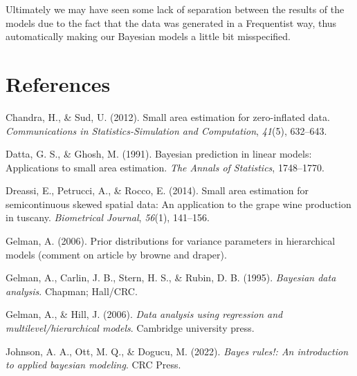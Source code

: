\documentclass[12pt,twoside]{reedthesis}
\newlength{\cslhangindent}
\newenvironment{CSLReferences}[2] %
 {%
  \setlength{\parindent}{0pt}
  \ifodd #1 \everypar{\setlength{\hangindent}{\cslhangindent}}\ignorespaces\fi
  \ifnum #2 > 0
  \setlength{\parskip}{#2\baselineskip}
  \fi
 }%
 {}
\begin{document}
Ultimately we may have seen some lack of separation between the results of the models due to the fact that the data was generated in a Frequentist way, thus automatically making our Bayesian models a little bit misspecified.

\backmatter

\hypertarget{references}{%
\chapter*{References}\label{references}}


\noindent

\setlength{\parindent}{-0.20in}

\hypertarget{refs}{}
\begin{CSLReferences}{1}{0}
\leavevmode{}%
Chandra, H., \& Sud, U. (2012). Small area estimation for zero-inflated data. \emph{Communications in Statistics-Simulation and Computation}, \emph{41}(5), 632--643.

\leavevmode{}%
Datta, G. S., \& Ghosh, M. (1991). Bayesian prediction in linear models: Applications to small area estimation. \emph{The Annals of Statistics}, 1748--1770.

\leavevmode{}%
Dreassi, E., Petrucci, A., \& Rocco, E. (2014). Small area estimation for semicontinuous skewed spatial data: An application to the grape wine production in tuscany. \emph{Biometrical Journal}, \emph{56}(1), 141--156.

\leavevmode{}%
Gelman, A. (2006). Prior distributions for variance parameters in hierarchical models (comment on article by browne and draper).

\leavevmode{}%
Gelman, A., Carlin, J. B., Stern, H. S., \& Rubin, D. B. (1995). \emph{Bayesian data analysis}. Chapman; Hall/CRC.

\leavevmode{}%
Gelman, A., \& Hill, J. (2006). \emph{Data analysis using regression and multilevel/hierarchical models}. Cambridge university press.

\leavevmode{}%
Johnson, A. A., Ott, M. Q., \& Dogucu, M. (2022). \emph{Bayes rules!: An introduction to applied bayesian modeling}. CRC Press.


\end{CSLReferences}
\end{document}

